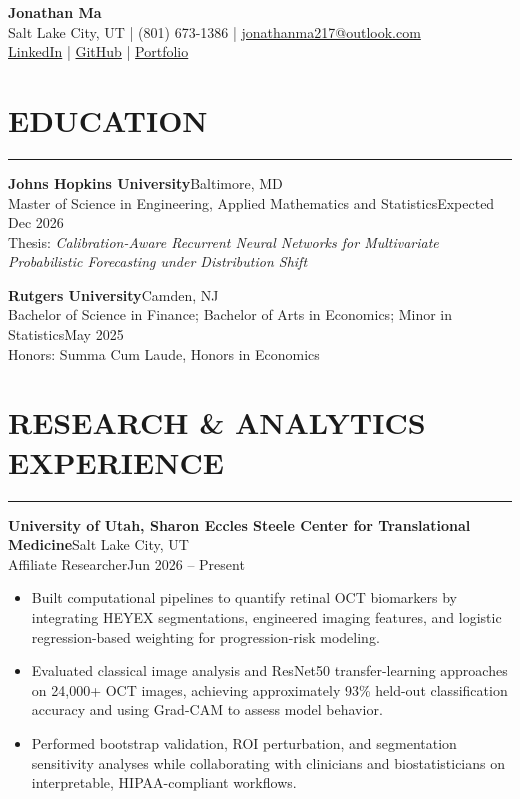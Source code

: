 \documentclass[10pt]{article}
\newcommand{\resheading}[1]{%
  \section*{#1}\vspace{-4pt}\color{rulegray}\hrule\vspace{4pt}\color{black}
}
\newcommand{\entry}[4]{%
  \textbf{#1}\hfill #2\\[-1pt]%
  #3\hfill #4\\[-3pt]%
}
\newcommand{\workentry}[4]{%
  \textbf{#1}\hfill #2\\[-1pt]%
  #3\hfill #4\\[-5pt]%
}
\begin{document}
\begin{center}
{\LARGE \textbf{Jonathan Ma}}\\[-2pt]
Salt Lake City, UT \;|\; (801) 673-1386 \;|\; \href{mailto:jonathanma217@outlook.com}{jonathanma217@outlook.com}\\[-1pt]
\href{https://www.linkedin.com/in/jonathanma217/}{LinkedIn} \;|\;
\href{https://github.com/JonathanMa03}{GitHub} \;|\;
\href{https://jonathanma03.github.io/}{Portfolio}
\end{center}
\vspace{-2pt}

\resheading{EDUCATION}

\entry{Johns Hopkins University}{Baltimore, MD}{Master of Science in Engineering, Applied Mathematics and Statistics}{Expected Dec 2026}
Thesis: \textit{Calibration-Aware Recurrent Neural Networks for Multivariate Probabilistic Forecasting under Distribution Shift}

\vspace{1pt}

\entry{Rutgers University}{Camden, NJ}{Bachelor of Science in Finance; Bachelor of Arts in Economics; Minor in Statistics}{May 2025}
Honors: Summa Cum Laude, Honors in Economics

\resheading{RESEARCH \& ANALYTICS EXPERIENCE}

\workentry{University of Utah, Sharon Eccles Steele Center for Translational Medicine}{Salt Lake City, UT}{Affiliate Researcher}{Jun 2026 -- Present}
\begin{itemize}
\item Built computational pipelines to quantify retinal OCT biomarkers by integrating HEYEX segmentations, engineered imaging features, and logistic regression-based weighting for progression-risk modeling.
\item Evaluated classical image analysis and ResNet50 transfer-learning approaches on 24,000+ OCT images, achieving approximately 93\% held-out classification accuracy and using Grad-CAM to assess model behavior.
\item Performed bootstrap validation, ROI perturbation, and segmentation sensitivity analyses while collaborating with clinicians and biostatisticians on interpretable, HIPAA-compliant workflows.
\end{itemize}

\vspace{1pt}
\end{document}
